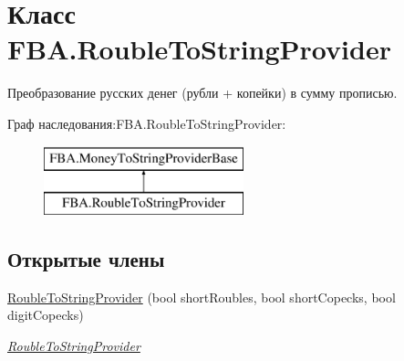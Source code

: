\hypertarget{class_f_b_a_1_1_rouble_to_string_provider}{}\section{Класс F\+B\+A.\+Rouble\+To\+String\+Provider}
\label{class_f_b_a_1_1_rouble_to_string_provider}


Преобразование русских денег (рубли + копейки) в сумму прописью.  


Граф наследования\+:F\+B\+A.\+Rouble\+To\+String\+Provider\+:\begin{figure}[H]
\begin{center}
\leavevmode
\includegraphics[height=2.000000cm]{class_f_b_a_1_1_rouble_to_string_provider}
\end{center}
\end{figure}
\subsection*{Открытые члены}
\begin{DoxyCompactItemize}
\item 
\mbox{\hyperlink{class_f_b_a_1_1_rouble_to_string_provider_a3916fcca77df7a8fc22651de89e06022}{Rouble\+To\+String\+Provider}} (bool short\+Roubles, bool short\+Copecks, bool digit\+Copecks)
\begin{DoxyCompactList}\small\item\em \mbox{\hyperlink{class_f_b_a_1_1_rouble_to_string_provider}{Rouble\+To\+String\+Provider}} \end{DoxyCompactList}\end{DoxyCompactItemize}
